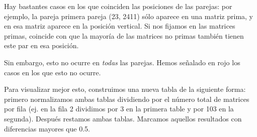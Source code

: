 Hay bastantes casos en los que coinciden las posiciones de las parejas: por ejemplo, la pareja primera pareja (23, 2411) sólo aparece en una matriz prima, y en esa matriz aparece en la posición vertical. Si nos fijamos en las matrices primas, coincide con que la mayoría de las matrices no primas también tienen este par en esa posición.

Sin embargo, esto no ocurre en \textit{todas} las parejas. Hemos señalado en rojo los casos en los que esto no ocurre.

Para visualizar mejor esto, construimos una nueva tabla de la siguiente forma: primero normalizamos ambas tablas dividiendo por el número total de matrices por fila (ej. en la fila 2 dividimos por 3 en la primera table y por 103 en la segunda). Después restamos ambas tablas. Marcamos aquellos resultados con diferencias mayores que 0.5.

